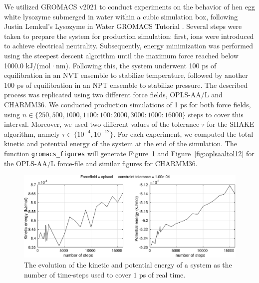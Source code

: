 \documentclass[runningheads]{llncs}
\begin{document}
We utilized GROMACS v2021 to conduct experiments on the behavior of hen egg white lysozyme submerged in water within a cubic simulation box, following Justin Lemkul's Lysozyme in Water GROMACS Tutorial \cite{lemkul2019from}. Several steps were taken to prepare the system for production simulation: first, ions were introduced to achieve electrical neutrality. Subsequently, energy minimization was performed using the steepest descent algorithm until the maximum force reached below 1000.0 kJ/(mol·nm). Following this, the system underwent 100 ps of equilibration in an NVT ensemble to stabilize temperature, followed by another 100 ps of equilibration in an NPT ensemble to stabilize pressure. The described process was replicated using two different force fields, OPLS-AA/L and CHARMM36. We conducted production simulations of 1 ps for both force fields, using $n \in \{250, 500, 1000, 1100:100:2000, 3000:1000:16000 \}$ steps to cover this interval.
Moreover, we used two different values of the tolerance $\tau$ for the SHAKE algorithm, namely $\tau \in \{10^{-4}, 10^{-12}\}$. 
For each experiment, we computed the total kinetic and potential energy of the system at the end of the simulation.
The function {\tt gromacs\_figures} will generate Figure~\ref{fig:oplsaaltol04} and Figure~\ref{fig:oplsaaltol12} for the OPLS-AA/L force-file and similar figures for CHARMM36.

\begin{figure}
  \centering
  \includegraphics[width=\linewidth]{oplsaaltol04.pdf}
  \caption{The evolution of the kinetic and potential energy of a system as the number of time-steps used to cover $1$ ps of real time.} \label{fig:oplsaaltol04}
\end{figure}
\end{document}
